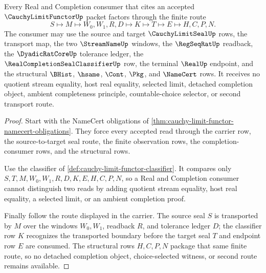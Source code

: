 \begin{theorem}
\label{thm:cauchy-limit-functor-real-completion-consumer}
Every Real and Completion consumer that cites an accepted $\CauchyLimitFunctorUp$ packet factors through the finite route
$$
S \longmapsto M \longmapsto W_0,W_1,R,D \longmapsto K \longmapsto T \longmapsto E \longmapsto H,C,P,N.
$$
The consumer may use the source and target $\CauchyLimitSealUp$ rows, the transport map, the two $\StreamNameUp$ windows, the $\RegSeqRatUp$ readback, the $\DyadicRatCoreUp$ tolerance ledger, the $\RealCompletionSealClassifierUp$ row, the terminal $\RealUp$ endpoint, and the structural $\BHist$, $\hsame$, $\Cont$, $\Pkg$, and $\NameCert$ rows. It receives no quotient stream equality, host real equality, selected limit, detached completion object, ambient completeness principle, countable-choice selector, or second transport route.
\end{theorem}
\begin{proof}
Start with the NameCert obligations of \autoref{thm:cauchy-limit-functor-namecert-obligations}. They force every accepted read through the carrier row, the source-to-target seal route, the finite observation rows, the completion-consumer rows, and the structural rows.

Use the classifier of \autoref{def:cauchy-limit-functor-classifier}. It compares only $S,T,M,W_0,W_1,R,D,K,E,H,C,P,N$, so a Real and Completion consumer cannot distinguish two reads by adding quotient stream equality, host real equality, a selected limit, or an ambient completion proof.

Finally follow the route displayed in the carrier. The source seal $S$ is transported by $M$ over the windows $W_0,W_1$, readback $R$, and tolerance ledger $D$; the classifier row $K$ recognizes the transported boundary before the target seal $T$ and endpoint row $E$ are consumed. The structural rows $H,C,P,N$ package that same finite route, so no detached completion object, choice-selected witness, or second route remains available.
\end{proof}

